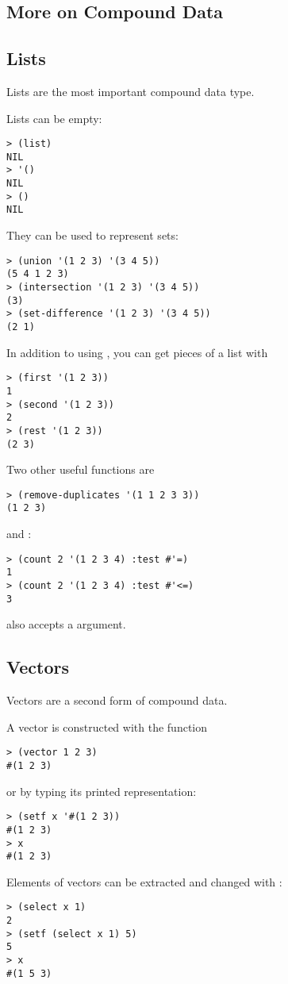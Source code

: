 \begin{slide}{}
\section{More on Compound Data}
\subsection{Lists}
Lists are the most important compound data type.

Lists can be empty:
{\Large
\begin{verbatim}
> (list)
NIL
> '()
NIL
> ()
NIL
\end{verbatim}}
They can be used to represent sets:
{\Large
\begin{verbatim}
> (union '(1 2 3) '(3 4 5))
(5 4 1 2 3)
> (intersection '(1 2 3) '(3 4 5))
(3)
> (set-difference '(1 2 3) '(3 4 5))
(2 1)
\end{verbatim}}
\end{slide}

\begin{slide}{}
In addition to using , you can get pieces of a list with
{\Large
\begin{verbatim}
> (first '(1 2 3))
1
> (second '(1 2 3))
2
> (rest '(1 2 3))
(2 3)
\end{verbatim}}
Two other useful functions are 
{\Large
\begin{verbatim}
> (remove-duplicates '(1 1 2 3 3))
(1 2 3)
\end{verbatim}}
and :
{\Large
\begin{verbatim}
> (count 2 '(1 2 3 4) :test #'=)
1
> (count 2 '(1 2 3 4) :test #'<=)
3
\end{verbatim}}
 also accepts a  argument.
\end{slide}

\begin{slide}{}
\subsection{Vectors}
Vectors are a second form of compound data.

A vector is constructed with the  function
{\Large
\begin{verbatim}
> (vector 1 2 3)
#(1 2 3)
\end{verbatim}}
or by typing its printed representation:
{\Large
\begin{verbatim}
> (setf x '#(1 2 3))
#(1 2 3)
> x
#(1 2 3)
\end{verbatim}}
Elements of vectors can be extracted and changed with :
{\Large
\begin{verbatim}
> (select x 1)
2
> (setf (select x 1) 5)
5
> x
#(1 5 3)
\end{verbatim}}
\end{slide}


